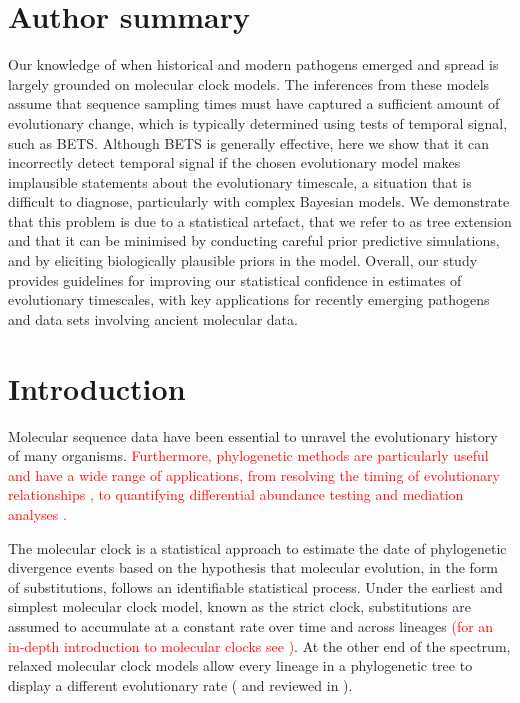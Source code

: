 \documentclass[10pt,letterpaper]{article}
\begin{document}
\section*{Author summary}
Our knowledge of when historical and modern pathogens emerged and spread is largely grounded on molecular clock models. The inferences from these models assume that sequence sampling times must have captured a sufficient amount of evolutionary change, which is typically determined using tests of temporal signal, such as BETS. Although BETS is generally effective, here we show that it can incorrectly detect temporal signal if the chosen evolutionary model makes implausible statements about the evolutionary timescale, a situation that is difficult to diagnose, particularly with complex Bayesian models. We demonstrate that this problem is due to a statistical artefact, that we refer to as tree extension and that it can be minimised by conducting careful prior predictive simulations, and by eliciting biologically plausible priors in the model. Overall, our study provides guidelines for improving our statistical confidence in estimates of evolutionary timescales, with key applications for recently emerging pathogens and data sets involving ancient molecular data.

\linenumbers

\section*{Introduction}
Molecular sequence data have been essential to unravel the evolutionary history of many organisms. \textcolor{red}{Furthermore, phylogenetic methods are particularly useful and have a wide range of applications, from resolving the timing of evolutionary relationships \cite{bromham2018bayesian}, to quantifying differential abundance testing and mediation analyses \cite{hong2023phylomed, zhou2021transformation}.}

The molecular clock is a statistical approach to estimate the date of phylogenetic divergence events based on the hypothesis that molecular evolution, in the form of substitutions, follows an identifiable statistical process. Under the earliest and simplest molecular clock model, known as the strict clock, substitutions are assumed to accumulate at a constant rate over time and across lineages \cite{zuckerkandl1965evolutionary} \textcolor{red}{(for an in-depth introduction to molecular clocks see \cite{bromham2018bayesian})}. At the other end of the spectrum, relaxed molecular clock models allow every lineage in a phylogenetic tree to display a different evolutionary rate (\cite{drummond2006relaxed} and reviewed in \cite{ho2014molecular}). 
\end{document}
